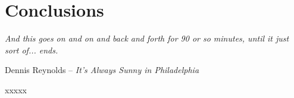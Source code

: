 \chapter{Conclusions}

\epigraph{\textit{And this goes on and on and back and forth for 90 or so minutes, until it just sort of... ends.}}{Dennis Reynolds -- \textit{It's Always Sunny in Philadelphia}}

\vspace{1cm}

\par\noindent xxxxx
